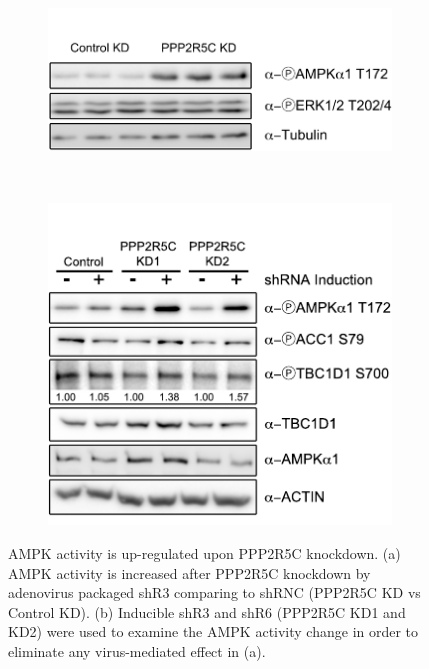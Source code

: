 \begin{figure}[htbp]
\centering
	\begin{subfigure}[t]{0.48\textwidth}
	\includegraphics[width=1\textwidth]{figs/fig2-50a ampk increase AV shR3.pdf}
    \label{fig:fig2.50a}
	\end{subfigure} %
~
	\begin{subfigure}[t]{0.48\textwidth}
	\includegraphics[width=1\textwidth]{figs/fig2-50b ampk increase.pdf}
    \label{fig:fig2.50b}
	\end{subfigure}
\caption[AMPK activity increases upon PPP2R5C knockdown]{\footnotesize AMPK activity is up-regulated upon PPP2R5C knockdown. (a) AMPK activity is increased after PPP2R5C knockdown by adenovirus packaged shR3 comparing to shRNC (PPP2R5C KD vs Control KD). (b) Inducible shR3 and shR6 (PPP2R5C KD1 and KD2) were used to examine the AMPK activity change in order to eliminate any virus-mediated effect in (a).}
\label{fig:fig2.50}
\end{figure}

